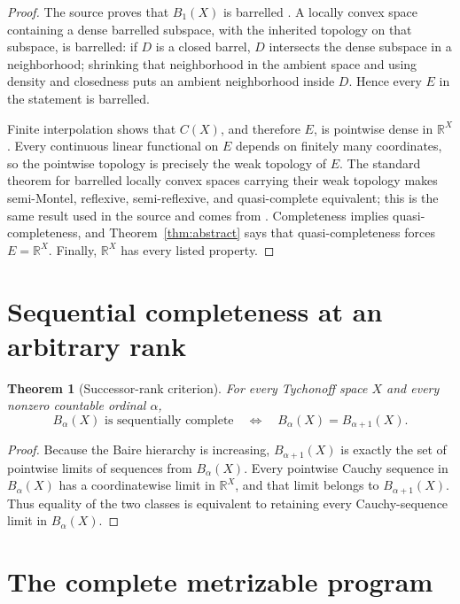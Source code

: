 \documentclass[11pt]{article}
\newtheorem{theorem}{Theorem}
\newcommand{\R}{\mathbb{R}}
\begin{document}
\begin{proof}
The source proves that $B_1(X)$ is barrelled
\cite[Theorem~1.1(i)]{GOR2026}.  A locally convex space containing a dense
barrelled subspace, with the inherited topology on that subspace, is
barrelled: if $D$ is a closed barrel, $D$ intersects the dense subspace in a
neighborhood; shrinking that neighborhood in the ambient space and using
density and closedness puts an ambient neighborhood inside $D$.  Hence every
$E$ in the statement is barrelled.

Finite interpolation shows that $C(X)$, and therefore $E$, is pointwise dense
in $\R^X$.  Every continuous linear functional on $E$ depends on finitely many
coordinates, so the pointwise topology is precisely the weak topology of
$E$.  The standard theorem for barrelled locally convex spaces carrying their
weak topology makes semi-Montel, reflexive, semi-reflexive, and
quasi-complete equivalent; this is the same result used in the source
\cite[proof of Theorem~3.3]{GOR2026} and comes from
\cite[Proposition~11.4.2]{Jarchow}.  Completeness implies
quasi-completeness, and Theorem~\ref{thm:abstract} says that
quasi-completeness forces $E=\R^X$.  Finally, $\R^X$ has every listed
property.
\end{proof}

\section{Sequential completeness at an arbitrary rank}

\begin{theorem}[Successor-rank criterion]\label{thm:sequential}
For every Tychonoff space $X$ and every nonzero countable ordinal $\alpha$,
\[
 B_\alpha(X)\text{ is sequentially complete}
 \quad\Longleftrightarrow\quad
 B_\alpha(X)=B_{\alpha+1}(X).
\]
\end{theorem}

\begin{proof}
Because the Baire hierarchy is increasing, $B_{\alpha+1}(X)$ is exactly the
set of pointwise limits of sequences from $B_\alpha(X)$.  Every pointwise
Cauchy sequence in $B_\alpha(X)$ has a coordinatewise limit in $\R^X$, and
that limit belongs to $B_{\alpha+1}(X)$.  Thus equality of the two classes is
equivalent to retaining every Cauchy-sequence limit in $B_\alpha(X)$.
\end{proof}

\section{The complete metrizable program}
\end{document}
